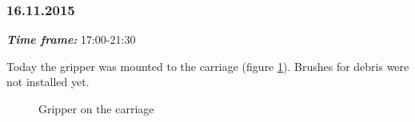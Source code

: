 \subsubsection{16.11.2015}
\textit{\textbf{Time frame:}} 17:00-21:30

Today the gripper was mounted to the carriage (figure \ref{Gripper1.2}). Brushes for debris were not installed yet.

\begin{figure}[H]
	\begin{minipage}[h]{1\linewidth}
		\caption{Gripper on the carriage}
		\label{Gripper1.2}
	\end{minipage}
\end{figure}


